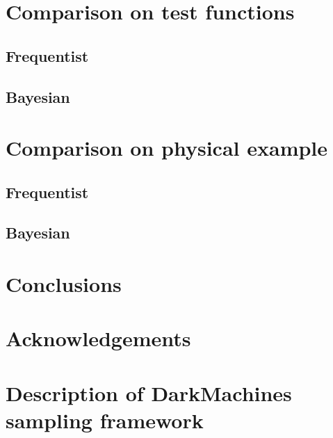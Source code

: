 \documentclass[11pt]{article}
\begin{document}
\section{Comparison on test functions}
\label{sec:test}
\subsection{Frequentist}
\subsection{Bayesian}

\section{Comparison on physical example}
\label{sec:physics}
\subsection{Frequentist}
\subsection{Bayesian}

\section{Conclusions}\label{Conclusions}
\label{sec:conclusions}
\section{Acknowledgements}



\appendix
\section{Description of DarkMachines sampling framework}
\label{app:python}
\end{document}
